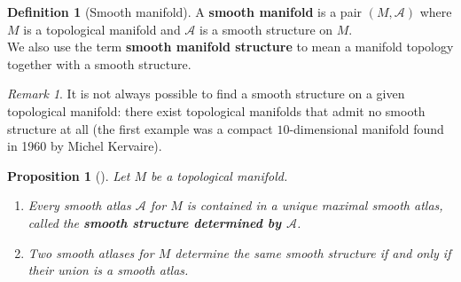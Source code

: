 \documentclass[reqno]{amsart}
\theoremstyle{plain}%
\newtheorem{proposition}[theorem]{Proposition}
\theoremstyle{definition}
\newtheorem{definition}[theorem]{Definition}
\theoremstyle{remark}
\newtheorem*{remark}{Remark}
\begin{document}
            \begin{definition}[Smooth manifold]
            A \textbf{smooth manifold} is a pair $\left( M, \mathcal{A} \right) $ where
            $M$ is a topological manifold and $\mathcal{A}$ is a smooth structure on
            $M$.\\
            We also use the term \textbf{smooth manifold structure} to mean a manifold
            topology together with a smooth structure.
            \end{definition}

            \begin{remark}
            It is not always possible to find a smooth structure on a given topological
            manifold: there exist topological manifolds that admit no smooth structure
            at all (the first example was a compact $10$-dimensional manifold found in
            1960 by Michel Kervaire).
            \end{remark}

            \begin{proposition}[]
            Let $M$ be a topological manifold.
            \begin{enumerate}
                \item Every smooth atlas $\mathcal{A}$ for $M$ is contained in a unique
                    maximal smooth atlas, called the
                    \textbf{smooth structure determined by $\mathcal{A}$}.
                \item Two smooth atlases for $M$ determine the same smooth structure if
                    and only if their union is a smooth atlas.
            \end{enumerate}
            \end{proposition}
\end{document}
